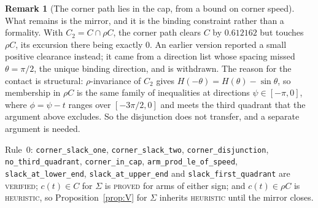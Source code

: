 \documentclass[11pt]{article}
\theoremstyle{definition}
\newtheorem{remark}[theorem]{Remark}
\newcommand{\Sig}{\Sigma}
\begin{document}
\begin{remark}[The corner path lies in the cap, from a bound on corner speed]
What remains is the mirror, and it is the binding constraint rather than a formality. With
$C_2=C\cap\rho C$, the corner path clears $C$ by $0.612162$ but touches $\rho C$, its
excursion there being exactly $0$. An earlier version reported a small positive clearance
instead; it came from a direction list whose spacing missed $\theta=\pi/2$, the unique
binding direction, and is withdrawn. The reason for the contact is structural: $\rho$-invariance of $C_2$ gives
$H(-\theta)=H(\theta)-\sin\theta$, so membership in $\rho C$ is the same family of
inequalities at directions $\psi\in[-\pi,0]$, where $\phi=\psi-t$ ranges over
$[-3\pi/2,0]$ and meets the third quadrant that the argument above excludes. So the
disjunction does not transfer, and a separate argument is needed.

Rule~0: \verb|corner_slack_one|, \verb|corner_slack_two|, \verb|corner_disjunction|,
\verb|no_third_quadrant|, \verb|corner_in_cap|, \verb|arm_prod_le_of_speed|,
\verb|slack_at_lower_end|, \verb|slack_at_upper_end| and \verb|slack_first_quadrant| are
\textsc{verified}; $c(t)\in C$ for $\Sig$ is \textsc{proved} for arms of either sign; and
$c(t)\in\rho C$ is \textsc{heuristic}, so Proposition~\ref{prop:V} for $\Sig$ inherits
\textsc{heuristic} until the mirror closes.
\end{remark}
\end{document}
